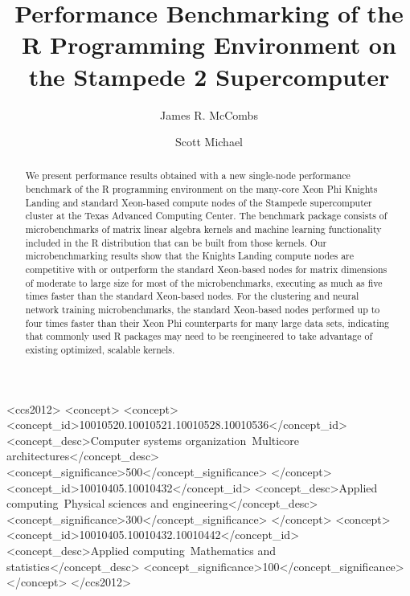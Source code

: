 \documentclass[sigconf]{acmart}
\begin{document}
\title{Performance Benchmarking of the R Programming Environment on the Stampede 2 Supercomputer}


\author{James R. McCombs}

\author{Scott Michael}

\renewcommand{\shortauthors}{J.R. McCombs et al.}


\begin{abstract}
We present performance results obtained with a new single-node performance
  benchmark of the R programming environment on the many-core Xeon Phi Knights
  Landing and standard Xeon-based compute nodes of the Stampede supercomputer
  cluster at the Texas Advanced Computing Center.
The benchmark package consists of microbenchmarks of matrix linear algebra
  kernels and machine learning functionality included in the R distribution that
  can be built from those kernels.
Our microbenchmarking results show that the Knights Landing compute nodes are
  competitive with or outperform the standard Xeon-based nodes for matrix
  dimensions of moderate to large size for most of the microbenchmarks,
  executing as much as five times faster than the standard Xeon-based nodes.
For the clustering and neural network training microbenchmarks, the standard
  Xeon-based nodes performed up to four times faster than their Xeon Phi
  counterparts for many large data sets, indicating that commonly used R
  packages may need to be reengineered to take advantage of existing optimized,
  scalable kernels.
\end{abstract}

%
%
\begin{CCSXML}
<ccs2012>
<concept>
<concept>
<concept_id>10010520.10010521.10010528.10010536</concept_id>
<concept_desc>Computer systems organization~Multicore architectures</concept_desc>
<concept_significance>500</concept_significance>
</concept>
<concept_id>10010405.10010432</concept_id>
<concept_desc>Applied computing~Physical sciences and engineering</concept_desc>
<concept_significance>300</concept_significance>
</concept>
<concept>
<concept_id>10010405.10010432.10010442</concept_id>
<concept_desc>Applied computing~Mathematics and statistics</concept_desc>
<concept_significance>100</concept_significance>
</concept>
</ccs2012>
\end{CCSXML}
\end{document}
